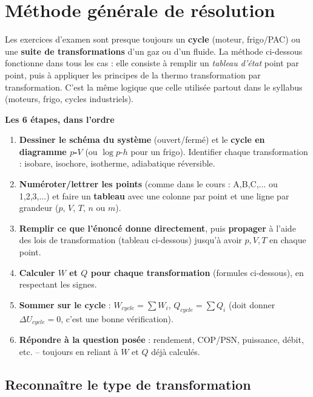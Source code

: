 \section{Méthode générale de résolution}

Les exercices d'examen sont presque toujours un \textbf{cycle} (moteur, frigo/PAC) ou une \textbf{suite de
transformations} d'un gaz ou d'un fluide. La méthode ci-dessous fonctionne dans tous les cas : elle consiste
à remplir un \emph{tableau d'état} point par point, puis à appliquer les principes de la thermo transformation
par transformation. C'est la même logique que celle utilisée partout dans le syllabus (moteurs, frigo, cycles
industriels).

\begin{methode}
\textbf{Les 6 étapes, dans l'ordre}
\begin{enumerate}[label=\textbf{\arabic*.}, leftmargin=1.6em]
\item \textbf{Dessiner le schéma du système} (ouvert/fermé) et le \textbf{cycle en diagramme $p$-$V$} (ou
$\log p$-$h$ pour un frigo). Identifier chaque transformation : isobare, isochore, isotherme, adiabatique
réversible.
\item \textbf{Numéroter/lettrer les points} (comme dans le cours : A,B,C,... ou 1,2,3,...) et faire un
\textbf{tableau} avec une colonne par point et une ligne par grandeur ($p$, $V$, $T$, $n$ ou $m$).
\item \textbf{Remplir ce que l'énoncé donne directement}, puis \textbf{propager} à l'aide des lois de
transformation (tableau ci-dessous) jusqu'à avoir $p,V,T$ en chaque point.
\item \textbf{Calculer $W$ et $Q$ pour chaque transformation} (formules ci-dessous), en respectant les signes.
\item \textbf{Sommer sur le cycle} : $W_{cycle}=\sum W_i$, $Q_{cycle}=\sum Q_i$ (doit donner $\Delta U_{cycle}=0$,
c'est une bonne vérification).
\item \textbf{Répondre à la question posée} : rendement, COP/PSN, puissance, débit, etc. -- toujours en
reliant à $W$ et $Q$ déjà calculés.
\end{enumerate}
\end{methode}

\subsection{Reconnaître le type de transformation}

